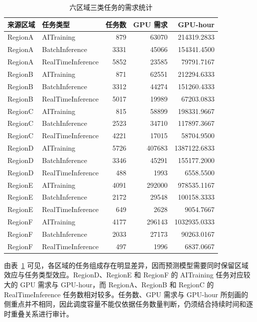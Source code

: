 \documentclass[withoutpreface,bwprint]{cumcmthesis}
\begin{document}
\begin{table}[htbp]
\centering
\caption{六区域三类任务的需求统计}
\label{tab:q1_group_statistics}
\begin{tabular}{llrrr}
\toprule
来源区域 & 任务类型 & 任务数 & GPU 需求 & GPU-hour\\
\midrule
RegionA & AITraining & 879 & 63070 & 214319.2833\\
RegionA & BatchInference & 3331 & 45066 & 154341.4500\\
RegionA & RealTimeInference & 5852 & 23585 & 79791.7167\\
RegionB & AITraining & 871 & 62551 & 212294.6333\\
RegionB & BatchInference & 3312 & 44274 & 151260.4333\\
RegionB & RealTimeInference & 5017 & 19989 & 67203.0833\\
RegionC & AITraining & 815 & 58899 & 198331.9667\\
RegionC & BatchInference & 2523 & 34710 & 117897.3667\\
RegionC & RealTimeInference & 4221 & 17015 & 58704.9500\\
RegionD & AITraining & 5726 & 407683 & 1387122.6833\\
RegionD & BatchInference & 3346 & 45291 & 155177.2000\\
RegionD & RealTimeInference & 488 & 1993 & 6558.5500\\
RegionE & AITraining & 4091 & 292000 & 978535.1167\\
RegionE & BatchInference & 2172 & 29548 & 100158.3333\\
RegionE & RealTimeInference & 649 & 2628 & 9054.7667\\
RegionF & AITraining & 4177 & 296143 & 1032935.0333\\
RegionF & BatchInference & 2033 & 27173 & 90263.0167\\
RegionF & RealTimeInference & 497 & 1996 & 6837.0667\\
\bottomrule
\end{tabular}
\end{table}

由表~\ref{tab:q1_group_statistics} 可见，各区域的任务组成存在明显差异，因而预测模型需要同时保留区域效应与任务类型效应。RegionD、RegionE 和 RegionF 的 AITraining 任务对应较大的 GPU 需求与 GPU-hour，而 RegionA、RegionB 和 RegionC 的 RealTimeInference 任务数相对较多。任务数、GPU 需求与 GPU-hour 所刻画的侧重点并不相同，因此调度容量不能仅依据任务数量判断，仍须结合持续时间和逐时重叠关系进行审计。
\end{document}
